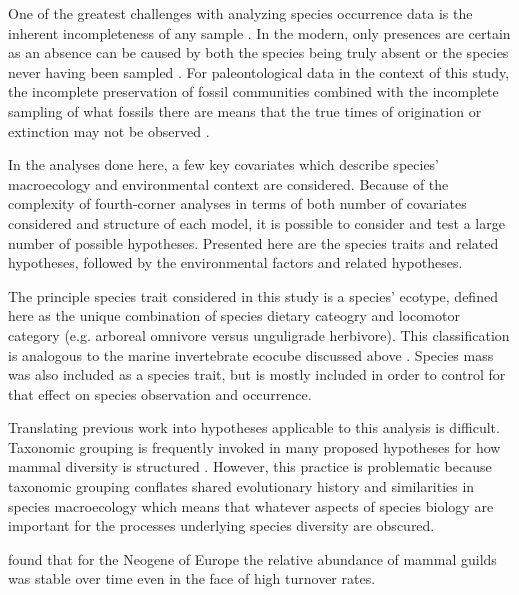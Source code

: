 \documentclass[12pt,letterpaper]{article}
\begin{document}
One of the greatest challenges with analyzing species occurrence data is the inherent incompleteness of any sample \citep{Royle2008,Royle2014,Foote1999a,Foote2001,Lloyd2011,Wang2016b}. In the modern, only presences are certain as an absence can be caused by both the species being truly absent or the species never having been sampled \citep{Royle2008,Royle2014}. For paleontological data in the context of this study, the incomplete preservation of fossil communities combined with the incomplete sampling of what fossils there are means that the true times of origination or extinction may not be observed \citep{Foote1999a,Foote2001,Wang2015,Wang2016b}.



In the analyses done here, a few key covariates which describe species' macroecology and environmental context are considered. Because of the complexity of fourth-corner analyses in terms of both number of covariates considered and structure of each model, it is possible to consider and test a large number of possible hypotheses. Presented here are the species traits and related hypotheses, followed by the environmental factors and related hypotheses.

The principle species trait considered in this study is a species' ecotype, defined here as the unique combination of species dietary cateogry and locomotor category (e.g. arboreal omnivore versus unguligrade herbivore). This classification is analogous to the marine invertebrate ecocube discussed above \citep{Bush2007,Bambach2008,Bush2011}. Species mass was also included as a species trait, but is mostly included in order to control for that effect on species observation and occurrence.


Translating previous work into hypotheses applicable to this analysis is difficult. Taxonomic grouping is frequently invoked in many proposed hypotheses for how mammal diversity is structured \citep{Quental2013,Slater2015c,Janis1993c,Pires2015a,Janis2008a}. However, this practice is problematic because taxonomic grouping conflates shared evolutionary history and similarities in species macroecology which means that whatever aspects of species biology are important for the processes underlying species diversity are obscured.

\citet{Jernvall2004} found that for the Neogene of Europe the relative abundance of mammal guilds was stable over time even in the face of high turnover rates.
\end{document}
